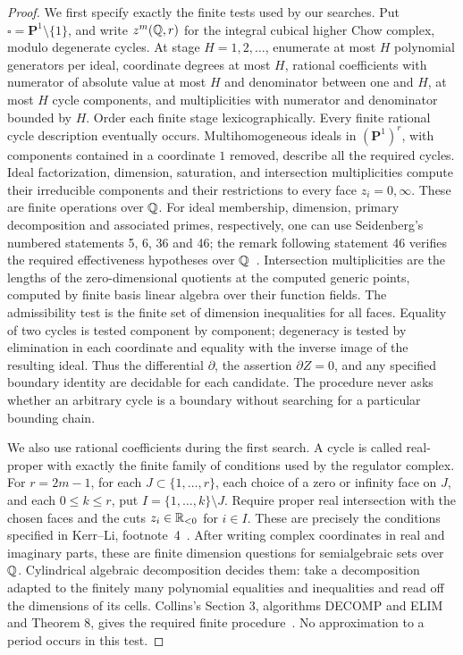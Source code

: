 \begin{proof}
We first specify exactly the finite tests used by our searches.  Put
\(\square=\mathbf P^1\setminus\{1\}\), and write
\(z^m(\mathbb Q,r)\) for the integral cubical higher Chow complex, modulo
degenerate cycles.  At stage \(H=1,2,\ldots\), enumerate at most \(H\) polynomial
generators per ideal, coordinate degrees at most \(H\), rational
coefficients with numerator of absolute value at most \(H\) and
denominator between one and \(H\), at most \(H\) cycle
components, and multiplicities with numerator and denominator bounded
by \(H\).  Order each finite stage lexicographically.  Every
finite rational cycle description eventually occurs.  Multihomogeneous
ideals in \((\mathbf P^1)^r\), with components contained in a
coordinate \(1\) removed, describe all the required cycles.  Ideal
factorization, dimension, saturation, and intersection multiplicities
compute their irreducible components and their restrictions to every
face \(z_i=0,\infty\).  These are finite operations over \(\mathbb Q\).
For ideal membership, dimension, primary decomposition and associated
primes, respectively, one can use Seidenberg's numbered statements
5, 6, 36 and 46; the remark following statement 46 verifies the
required effectiveness hypotheses over \(\mathbb Q\)~\cite{BSeidenberg1974}.
Intersection multiplicities are the lengths of the zero-dimensional
quotients at the computed generic points, computed by finite basis
linear algebra over their function fields.
The admissibility test is the finite set of dimension inequalities for
all faces.  Equality of two cycles is tested component by component;
degeneracy is tested by elimination in each coordinate and equality
with the inverse image of the resulting ideal.  Thus the differential
\(\partial\), the assertion \(\partial Z=0\), and any specified
boundary identity are decidable for each candidate.  The procedure
never asks whether an arbitrary cycle is a boundary without searching
for a particular bounding chain.

We also use rational coefficients during the first search.  A cycle is
called real-proper with exactly the finite family of conditions used
by the regulator complex.  For \(r=2m-1\), for each
\(J\subset\{1,\ldots,r\}\), each choice of a zero or infinity
face on \(J\), and each \(0\le k\le r\), put
\(I=\{1,\ldots,k\}\setminus J\).  Require proper real
intersection with the chosen faces and the cuts
\(z_i\in\mathbb R_{<0}\) for \(i\in I\).  These are precisely the
conditions specified in Kerr--Li, footnote~4~\cite{BKerrLi2020}.  After writing complex coordinates in real and
imaginary parts, these are finite dimension questions for semialgebraic
sets over \(\mathbb Q\).  Cylindrical algebraic decomposition decides them:
take a decomposition adapted to the finitely many polynomial equalities
and inequalities and read off the dimensions of its cells.  Collins's
Section 3, algorithms DECOMP and ELIM and Theorem 8, gives the
required finite procedure~\cite{BCollins1975}.  No
approximation to a period occurs in this test.


\end{proof}
